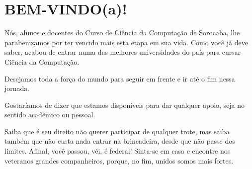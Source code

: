 \section{BEM-VINDO(a)!}

Nós, alunos e docentes do Curso de Ciência da Computação de Sorocaba, lhe parabenizamos por ter vencido mais esta etapa em sua vida. Como você já deve saber, acabou de entrar numa das melhores universidades do país para cursar Ciência da Computação. 

Desejamos toda a força do mundo para seguir em frente e ir até o fim nessa jornada.

Gostaríamos de dizer que estamos disponíveis para dar qualquer apoio, seja no sentido acadêmico ou pessoal.

Saiba que é seu direito não querer participar de qualquer trote, mas saiba também que não custa nada entrar na brincadeira, desde que não passe dos limites. Afinal, você passou, véi, é federal! Sinta-se em casa e encontre nos veteranos grandes companheiros, porque, no fim, unidos somos mais fortes.
